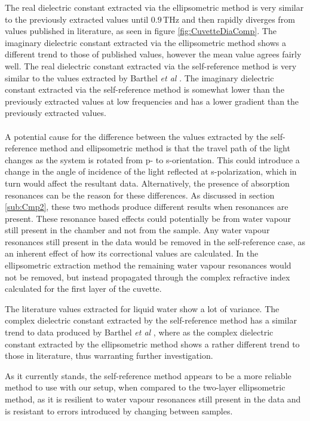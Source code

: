 The real dielectric constant extracted via the ellipsometric method is very similar to the previously extracted values until $0.9\,$THz and then rapidly diverges from values published in literature, as seen in figure \ref{fig:CuvetteDiaComp}. 
The imaginary dielectric constant extracted via the ellipsometric method shows a different trend to those of published values, however the mean value agrees fairly well.
The real dielectric constant extracted via the self-reference method is very similar to the values extracted by Barthel \textit{et al} \cite{Barthel1990}.
The imaginary dielectric constant extracted via the self-reference method is somewhat lower than the previously extracted values at low frequencies and has a lower gradient than the previously extracted values.
\paragraph{}
A potential cause for the difference between the values extracted by the self-reference method and ellipsometric method is that the travel path of the light changes as the system is rotated from p- to s-orientation. This could introduce a change in the angle of incidence of the light reflected at s-polarization, which in turn would affect the resultant data. Alternatively, the presence of absorption resonances can be the reason for these differences. As discussed in section \ref{sub:Cmp2}, these two methods produce different results when resonances are present. These resonance based effects could potentially be from water vapour still present in the chamber and not from the sample. Any water vapour resonances still present in the data would be removed in the self-reference case, as an inherent effect of how its correctional values are calculated. In the ellipsometric extraction method the remaining water vapour resonances would not be removed, but instead propagated through the complex refractive index calculated for the first layer of the cuvette. 

The literature values extracted for liquid water show a lot of variance. The complex dielectric constant extracted by the self-reference method has a similar trend to data produced by Barthel \textit{et al} \cite{Barthel1990}, where as the complex dielectric constant extracted by the ellipsometric method shows a rather different trend to those in literature, thus warranting further investigation.

As it currently stands, the self-reference method appears to be a more reliable method to use with our setup, when compared to the two-layer ellipsometric method, as it is resilient to water vapour resonances still present in the data and is resistant to errors introduced by changing between samples. 



\endinput